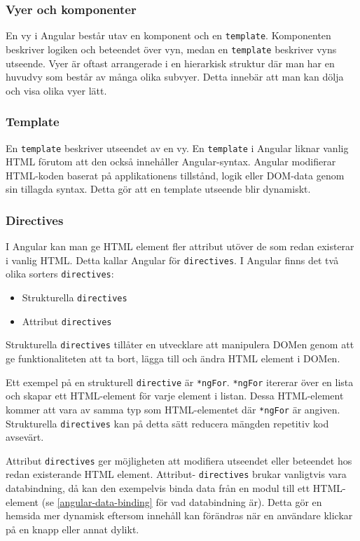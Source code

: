
\subsubsection{Vyer och komponenter}
En vy i Angular består utav en komponent och en \texttt{template}. Komponenten beskriver logiken och beteendet över vyn, medan en \texttt{template} beskriver vyns utseende. Vyer är oftast arrangerade i en hierarkisk struktur där man har en huvudvy som består av många olika subvyer. Detta innebär att man kan dölja och visa olika vyer lätt. 

\subsubsection{Template}
\label{angular-template}
En \texttt{template} beskriver utseendet av en vy. En \texttt{template} i Angular liknar vanlig HTML förutom att den också innehåller Angular-syntax. Angular modifierar HTML-koden baserat på applikationens tillstånd, logik eller DOM-data genom sin tillagda syntax.\cite{angular-components} Detta gör att en template utseende blir dynamiskt.

\subsubsection{Directives}
I Angular kan man ge HTML element fler attribut utöver de som redan existerar i vanlig HTML. Detta kallar Angular för \texttt{directives}. I Angular finns det två olika sorters \texttt{directives}:
\begin{itemize}
    \item Strukturella \texttt{directives}
    \item Attribut \texttt{directives}
\end{itemize}
Strukturella \texttt{directives} tillåter en utvecklare att manipulera DOMen genom att ge funktionaliteten att ta bort, lägga till och ändra HTML element i DOMen. \cite{angular-services} 

Ett exempel på en strukturell \texttt{directive} är \texttt{*ngFor}. \texttt{*ngFor} itererar över en lista och skapar ett HTML-element för varje element i listan. Dessa HTML-element kommer att vara av samma typ som HTML-elementet där \texttt{*ngFor} är angiven. Strukturella \texttt{directives} kan på detta sätt reducera mängden repetitiv kod avsevärt.

Attribut \texttt{directives} ger möjligheten att modifiera utseendet eller beteendet hos redan existerande HTML element. Attribut- \texttt{directives} brukar vanligtvis vara databindning, då kan den exempelvis binda data från en modul till ett HTML-element (se \ref{angular-data-binding} för vad databindning är). Detta gör en hemsida mer dynamisk eftersom innehåll kan förändras när en användare klickar på en knapp eller annat dylikt.

